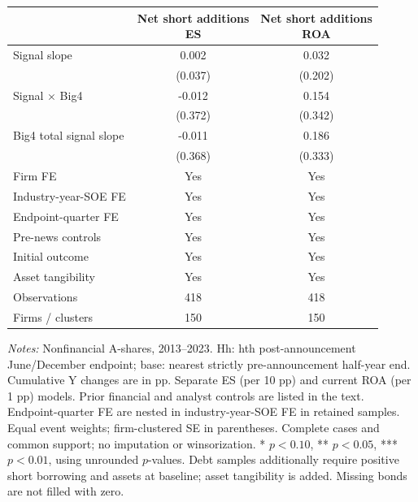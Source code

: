 \documentclass[10pt]{article}
\begin{document}
\begin{minipage}{17cm}\fontsize{10.5}{13}\selectfont\centering
\setlength{\tabcolsep}{4pt}\renewcommand{\arraystretch}{1.12}
\begin{tabular*}{\textwidth}{@{\extracolsep{\fill}}lcc@{}}\toprule
 & \shortstack{Net short additions\\ES} & \shortstack{Net short additions\\ROA} \\
\midrule
Signal slope & 0.002 & 0.032 \\
 & (0.037) & (0.202) \\
Signal $\times$ Big4 & -0.012 & 0.154 \\
 & (0.372) & (0.342) \\
Big4 total signal slope & -0.011 & 0.186 \\
 & (0.368) & (0.333) \\
\addlinespace
Firm FE & Yes & Yes \\
Industry-year-SOE FE & Yes & Yes \\
Endpoint-quarter FE & Yes & Yes \\
Pre-news controls & Yes & Yes \\
Initial outcome & Yes & Yes \\
Asset tangibility & Yes & Yes \\
Observations & 418 & 418 \\
Firms / clusters & 150 & 150 \\
\bottomrule\end{tabular*}
\par\medskip\raggedright\fontsize{9}{11}\selectfont
\textit{Notes:} Nonfinancial A-shares, 2013--2023. Hh: hth post-announcement June/December endpoint; base: nearest strictly pre-announcement half-year end. Cumulative Y changes are in pp. Separate ES (per 10 pp) and current ROA (per 1 pp) models. Prior financial and analyst controls are listed in the text. Endpoint-quarter FE are nested in industry-year-SOE FE in retained samples. Equal event weights; firm-clustered SE in parentheses. Complete cases and common support; no imputation or winsorization. * $p<0.10$, ** $p<0.05$, *** $p<0.01$, using unrounded $p$-values. Debt samples additionally require positive short borrowing and assets at baseline; asset tangibility is added. Missing bonds are not filled with zero.
\end{minipage}
\end{document}
